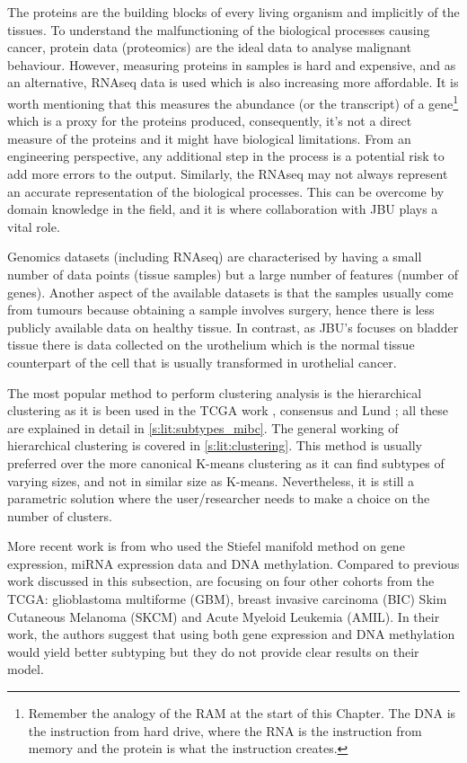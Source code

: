 The proteins are the building blocks of every living organism and implicitly of the tissues. To understand the malfunctioning of the biological processes causing cancer, protein data (proteomics) are the ideal data to analyse malignant behaviour. However, measuring proteins in samples is hard and expensive, and as an alternative, RNAseq data is used which is also increasing more affordable. It is worth mentioning that this measures the abundance (or the transcript) of a gene\footnote{Remember the analogy of the RAM at the start of this Chapter. The DNA is the instruction from hard drive, where the RNA is the instruction from memory and the protein is what the instruction creates.} which is a proxy for the proteins produced, consequently, it's not a direct measure of the proteins and it might have biological limitations. From an engineering perspective, any additional step in the process is a potential risk to add more errors to the output. Similarly, the RNAseq may not always represent an accurate representation of the biological processes. This can be overcome by domain knowledge in the field, and it is where collaboration with JBU plays a vital role.

Genomics datasets (including RNAseq) are characterised by having a small number of data points (tissue samples) but a large number of features (number of genes). Another aspect of the available datasets is that the samples usually come from tumours because obtaining a sample involves surgery, hence there is less publicly available data on healthy tissue. In contrast, as JBU's focuses on bladder tissue there is data collected on the urothelium which is the normal tissue counterpart of the cell that is usually transformed in urothelial cancer.

The most popular method to perform clustering analysis is the hierarchical clustering as it is been used in the TCGA work \cite{Robertson2017-mg}, consensus \citet{Kamoun2020-tj} and Lund \cite{Sjodahl2017-xr}; all these are explained in detail in \cref{s:lit:subtypes_mibc}. The general working of hierarchical clustering is covered in \cref{s:lit:clustering}. This method is usually preferred over the more canonical K-means clustering as it can find subtypes of varying sizes, and not in similar size as K-means. Nevertheless, it is still a parametric solution where the user/researcher needs to make a choice on the number of clusters.

More recent work is from \citet{Tian2021-vu} who used the Stiefel manifold method on gene expression, miRNA expression data and DNA methylation. Compared to previous work discussed in this subsection, \citet{Tian2021-vu} are focusing on four other cohorts from the TCGA: glioblastoma multiforme (GBM), breast invasive carcinoma (BIC) Skim Cutaneous Melanoma (SKCM) and Acute Myeloid Leukemia (AMIL). In their work, the authors suggest that using both gene expression and DNA methylation would yield better subtyping but they do not provide clear results on their model.

